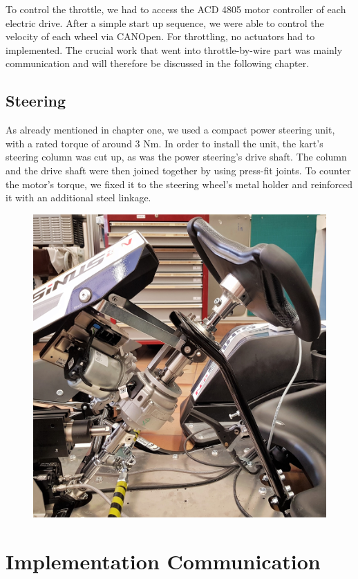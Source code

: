 To control the throttle, we had to access the ACD 4805 motor controller of each electric drive. After a simple start up sequence, we were able to control the velocity of each wheel via CANOpen. For throttling, no actuators had to implemented. The crucial work that went into throttle-by-wire part was mainly communication and will therefore be discussed in the following chapter.

\newpage

\subsection{Steering}

As already mentioned in chapter one, we used a compact power steering unit, with a rated torque of around 3 Nm. In order to install the unit, the kart's steering column was cut up, as was the power steering's drive shaft. The column and the drive shaft were then joined together by using press-fit joints. To counter the motor's torque, we fixed it to the steering wheel's metal holder and reinforced it with an additional steel linkage.

\begin{figure}[h]
	\centering
	\includegraphics[width=0.7\linewidth]{pictures_figures/Used/picture_powersteering}
	\caption{}
	\label{fig:picturepowersteering}
\end{figure}

\section{Implementation Communication}

